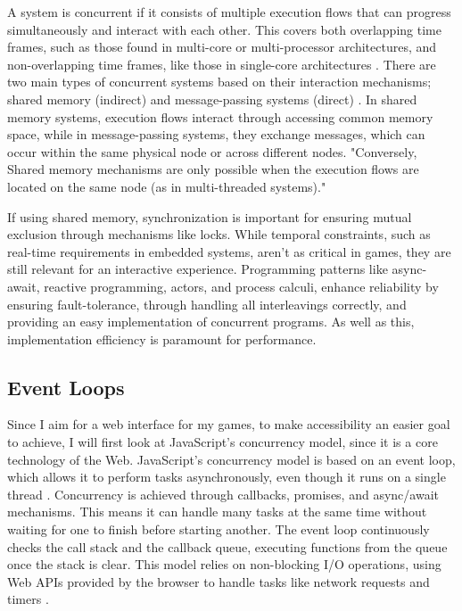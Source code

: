 \documentclass[]{interim}
\begin{document}
A system is concurrent if it consists of multiple execution flows that
can progress simultaneously and interact with each other.
This covers both overlapping time frames, such as those found
in multi-core or multi-processor architectures, and non-overlapping
time frames, like those in single-core architectures \cite{bianchi_survey_2018}.
There are two main types of concurrent systems based on their interaction
mechanisms; shared memory (indirect) and message-passing systems (direct) \cite{bianchi_survey_2018}.
In shared memory systems, execution flows interact through accessing
common memory space, while in message-passing systems,
they exchange messages, which can occur within the same physical
node or across different nodes. "Conversely, Shared memory mechanisms
are only possible when the execution flows are
located on the same node (as in multi-threaded systems)."\cite{bianchi_survey_2018}

If using shared memory, synchronization is important
for ensuring mutual exclusion through mechanisms like locks.
While temporal constraints, such as real-time requirements in embedded systems,
aren't as critical in games, they are still relevant for an interactive
experience. Programming patterns like async-await, reactive programming,
actors, and process calculi, enhance reliability by ensuring fault-tolerance,
through handling all interleavings correctly,
and providing an easy implementation of concurrent programs. As well as this, implementation efficiency
is paramount for performance.

\subsection{Event Loops}
Since I aim for a web interface for my games, to make
accessibility an easier goal to achieve, I will first look at JavaScript's
concurrency model, since it is a core technology of the Web.
JavaScript's concurrency model is based on an event loop, which allows it to
perform tasks asynchronously, even though it runs on a single thread \cite{zhao_concurrency_2021}.
Concurrency is achieved through callbacks, promises, and
async/await mechanisms. This means it can handle many tasks at the same time without waiting for one
to finish before starting another. The event loop continuously checks the call
stack and the callback queue, executing functions from the queue once
the stack is clear. This model relies on non-blocking I/O operations,
using Web APIs provided by the browser to handle tasks like network
requests and timers \cite{noauthor_event_2024}.
\end{document}
